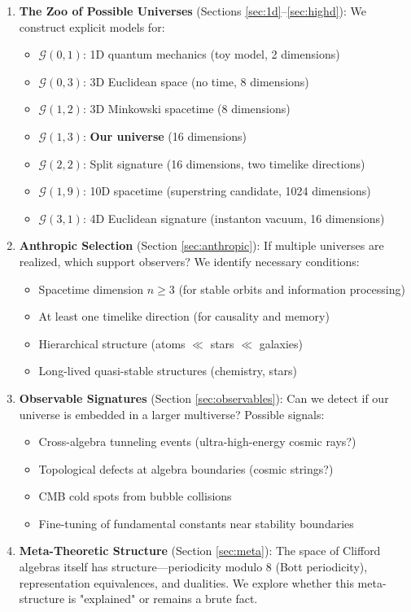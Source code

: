 \documentclass[11pt,a4paper]{article}
\numberwithin{equation}{section}
\theoremstyle{plain}
\theoremstyle{definition}
\theoremstyle{remark}
\newcommand{\Cl}{\mathcal{G}}               %
\begin{document}
\begin{enumerate}
\item \textbf{The Zoo of Possible Universes} (Sections \ref{sec:1d}--\ref{sec:highd}): We construct explicit models for:
\begin{itemize}
\item $\Cl(0,1)$: 1D quantum mechanics (toy model, 2 dimensions)
\item $\Cl(0,3)$: 3D Euclidean space (no time, 8 dimensions)
\item $\Cl(1,2)$: 3D Minkowski spacetime (8 dimensions)
\item $\Cl(1,3)$: \textbf{Our universe} (16 dimensions)
\item $\Cl(2,2)$: Split signature (16 dimensions, two timelike directions)
\item $\Cl(1,9)$: 10D spacetime (superstring candidate, 1024 dimensions)
\item $\Cl(3,1)$: 4D Euclidean signature (instanton vacuum, 16 dimensions)
\end{itemize}

\item \textbf{Anthropic Selection} (Section \ref{sec:anthropic}): If multiple universes are realized, which support observers? We identify necessary conditions:
\begin{itemize}
\item Spacetime dimension $n \geq 3$ (for stable orbits and information processing)
\item At least one timelike direction (for causality and memory)
\item Hierarchical structure (atoms $\ll$ stars $\ll$ galaxies)
\item Long-lived quasi-stable structures (chemistry, stars)
\end{itemize}

\item \textbf{Observable Signatures} (Section \ref{sec:observables}): Can we detect if our universe is embedded in a larger multiverse? Possible signals:
\begin{itemize}
\item Cross-algebra tunneling events (ultra-high-energy cosmic rays?)
\item Topological defects at algebra boundaries (cosmic strings?)
\item CMB cold spots from bubble collisions
\item Fine-tuning of fundamental constants near stability boundaries
\end{itemize}

\item \textbf{Meta-Theoretic Structure} (Section \ref{sec:meta}): The space of Clifford algebras itself has structure—periodicity modulo 8 (Bott periodicity), representation equivalences, and dualities. We explore whether this meta-structure is "explained" or remains a brute fact.
\end{enumerate}
\end{document}
